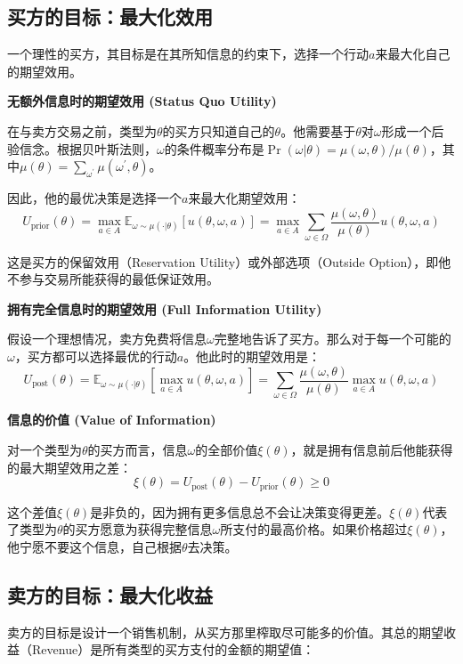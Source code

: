 \subsection{买方的目标：最大化效用}

一个理性的买方，其目标是在其所知信息的约束下，选择一个行动$a$来最大化自己的期望效用。

\textbf{无额外信息时的期望效用 (Status Quo Utility)}

在与卖方交易之前，类型为$\theta$的买方只知道自己的$\theta$。他需要基于$\theta$对$\omega$形成一个后验信念。根据贝叶斯法则，$\omega$的条件概率分布是$\Pr(\omega | \theta) = \mu(\omega,\theta)/\mu(\theta)$，其中$\mu(\theta)=\sum\limits_{\omega^\prime} \mu(\omega^\prime, \theta)$。

因此，他的最优决策是选择一个$a$来最大化期望效用：
$$U_{\text{prior}}(\theta) = \max_{a\in A}\mathbb{E}_{\omega\sim \mu(\cdot|\theta)}[u(\theta,\omega,a)]=\max_{a\in A}\sum\limits_{\omega\in\Omega}\frac{\mu(\omega,\theta)}{\mu(\theta)}u(\theta,\omega,a)$$

这是买方的保留效用（Reservation Utility）或外部选项（Outside Option），即他不参与交易所能获得的最低保证效用。

\textbf{拥有完全信息时的期望效用 (Full Information Utility)}

假设一个理想情况，卖方免费将信息$\omega$完整地告诉了买方。那么对于每一个可能的$\omega$，买方都可以选择最优的行动$a$。他此时的期望效用是：
$$U_{\text{post}}(\theta)=\mathbb{E}_{\omega\sim\mu(\cdot|\theta)}[\max_{a\in A} u(\theta,\omega,a)] = \sum\limits_{\omega\in\Omega}\frac{\mu(\omega,\theta)}{\mu(\theta)}\max_{a\in A}u(\theta,\omega,a)$$

\textbf{信息的价值 (Value of Information)}

对一个类型为$\theta$的买方而言，信息$\omega$的全部价值$\xi(\theta)$，就是拥有信息前后他能获得的最大期望效用之差：
$$\xi(\theta)=U_{\text{post}}(\theta)-U_{\text{prior}}(\theta) \geq 0$$

这个差值$\xi(\theta)$是非负的，因为拥有更多信息总不会让决策变得更差。$\xi(\theta)$代表了类型为$\theta$的买方愿意为获得完整信息$\omega$所支付的最高价格。如果价格超过$\xi(\theta)$，他宁愿不要这个信息，自己根据$\theta$去决策。

\subsection{卖方的目标：最大化收益}

卖方的目标是设计一个销售机制，从买方那里榨取尽可能多的价值。其总的期望收益（Revenue）是所有类型的买方支付的金额的期望值：

